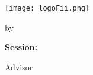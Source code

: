 \begin{titlepage}
    \begin{center}
        \large
        \MakeUppercase{\university}
        
        \LARGE
        \textbf{\MakeUppercase{\faculty}}
        
        \vspace{1cm}
        \texttt{[image: logoFii.png]}
        
        \vspace{1cm}
        \Large
        \MakeUppercase{\thesistype}
        
        \vspace{0.5cm}
        \LARGE
        \textbf{\thesistitle}
        
        \vspace{2cm}
        \Large
        by
        
        \vspace{0.5cm}
        \LARGE
        \textbf{\authornamefl}
        
        \vfill
        \Large
        \textbf{Session:} \session
        
        \vspace{2cm}
        \Large
        Advisor
        
        \vspace{0.5cm}
        \LARGE
        \textbf{\coordinator}
    \end{center}
\end{titlepage}